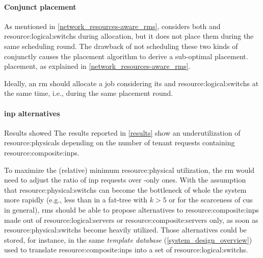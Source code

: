 \paragraph{Conjunct placement}
\ifdefined\THESISSUMMARY \else
As mentioned in \autoref{network_resources-aware_rms},
\fi
\cite{ontackling} considers both  and \glspl{resource:logical:switch} during allocation, but it does not place them during the same scheduling round.
The drawback of not scheduling these two kinds of  conjunctly causes the placement algorithm to derive a sub-optimal
\ifdefined\THESISSUMMARY
placement.
\else
placement, as explained in \autoref{network_resources-aware_rms}.

\fi
Ideally, an \gls{rm} should allocate a job considering its  and \glspl{resource:logical:switch} at the same time, i.e., during the same placement round.

\paragraph{\gls{inp} alternatives}
\ifdefined\THESISSUMMARY
Results showed
\else
The results reported in \autoref{results} show
\fi
an underutilization of \glspl{resource:physical} depending on the number of tenant requests containing \glspl{resource:composite:inp}.
\ifdefined\THESISSUMMARY \else

\fi
To maximize the (relative) minimum \gls{resource:physical} utilization, the \gls{rm} would need to adjust the ratio of \gls{inp} requests over -only ones.
With the assumption that \glspl{resource:physical:switch} can become the bottleneck of whole the system more rapidly (e.g., less  than  in a fat-tree with $k>5$ or for the scarceness of
\ifdefined\THESISSUMMARY
{}
\else
\glspl{cu}
\fi
in general),
\glspl{rm} should be able to propose alternatives to \glspl{resource:composite:inp} made out of \glspl{resource:logical:server} or \glspl{resource:composite:server} only, as soon as \glspl{resource:physical:switch} become heavily utilized.
Those alternatives could be stored, for instance, in the same \textit{template database}
\ifdefined\THESISSUMMARY \else
(\autoref{system_design_overview})
\fi
used to translate \glspl{resource:composite:inp} into a set of \glspl{resource:logical:switch}.
